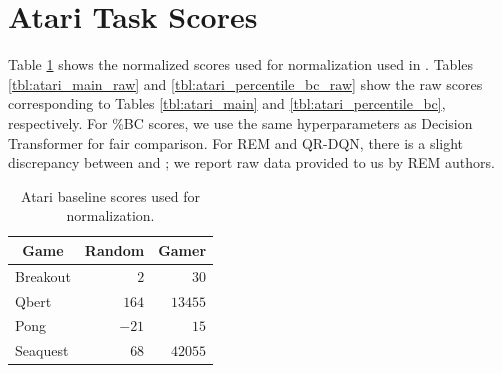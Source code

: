 
\section{Atari Task Scores} \label{appendix:atari_raw}
Table \ref{tbl:atari_baselines} shows the normalized scores used for normalization used in \citet{hafner2020mastering}. Tables \ref{tbl:atari_main_raw} and \ref{tbl:atari_percentile_bc_raw} show the raw scores corresponding to Tables \ref{tbl:atari_main} and \ref{tbl:atari_percentile_bc}, respectively. For \%BC scores, we use the same hyperparameters as Decision Transformer for fair comparison.  For REM and QR-DQN, there is a slight discrepancy between \citet{agarwal2020optimistic} and \citet{kumar2020conservative}; we report raw data provided to us by REM authors.

\begin{table}[h]
\centering
\small
\begin{tabular}{lrr}
\toprule
\multicolumn{1}{c}{\bf Game} & \multicolumn{1}{c}{\bf Random} & \multicolumn{1}{c}{\bf Gamer} \\
  \midrule
Breakout & $2$ & $30$ \\
Qbert & $164$ & $13455$ \\ 
Pong & $-21$ & $15$ \\
Seaquest & $68$ & $42055$ \\
 \bottomrule
 \end{tabular}
 \caption{Atari baseline scores used for normalization.}
 \label{tbl:atari_baselines}
\end{table}


